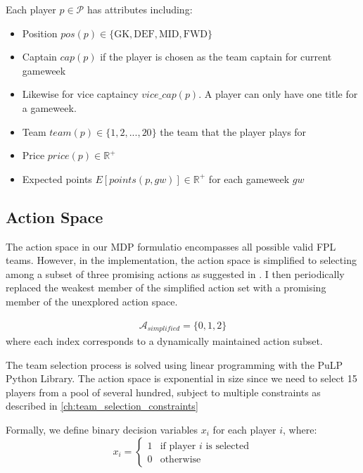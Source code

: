 Each player $p \in \mathcal{P}$ has attributes including:
\begin{itemize}
    \item Position $pos(p) \in \{\text{GK}, \text{DEF}, \text{MID}, \text{FWD}\}$
    \item Captain $cap(p)$ if the player is chosen as the team captain for current gameweek
    \item Likewise for vice captaincy $vice\_cap(p)$. A player can only have one title for a gameweek.
    \item Team $team(p) \in \{1, 2, ..., 20\}$ the team that the player plays for
    \item Price $price(p) \in \mathbb{R}^+$
    \item Expected points $E[points(p, gw)] \in \mathbb{R}^+$ for each gameweek $gw$
\end{itemize}

\subsection{Action Space} \label{action_space}
The action space in our MDP formulatio encompasses all possible valid FPL teams.
However, in the implementation, the action space is simplified to selecting among a subset of three promising actions as suggested in \cite{matthews2012}. I then periodically replaced the weakest member of the simplified action set with a promising member of the unexplored action space.

\begin{align}
\mathcal{A}_{simplified} = \{0, 1, 2\}
\end{align}
where each index corresponds to a dynamically maintained action subset.

The team selection process is solved using linear programming with the PuLP Python Library. The action space is exponential in size since we need to select 15 players from a pool of several hundred, subject to multiple constraints as described in \ref{ch:team_selection_constraints}

Formally, we define binary decision variables $x_i$ for each player $i$, where:
\begin{equation}
    x_i =
    \begin{cases}
        1 & \text{if player $i$ is selected} \\
        0 & \text{otherwise}
    \end{cases}
\end{equation}

